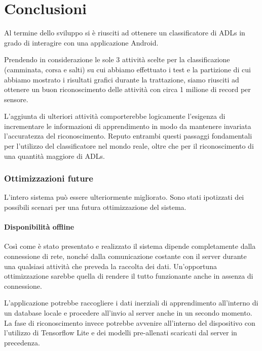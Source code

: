 \chapter{Conclusioni}
Al termine dello sviluppo si è riusciti ad ottenere un classificatore di ADLs in grado di interagire con una applicazione Android.

\vspace{5mm} %

Prendendo in considerazione le sole 3 attività scelte per la classificazione (camminata, corsa e salti) su cui abbiamo effettuato i test 
e la partizione di cui abbiamo mostrato i risultati grafici durante la trattazione, siamo riusciti ad ottenere un buon riconoscimento 
delle attività con circa 1 milione di record per sensore.

\vspace{5mm} %

L'aggiunta di ulteriori attività comporterebbe logicamente l'esigenza di incrementare le informazioni di apprendimento in modo da mantenere 
invariata l'accuratezza del riconoscimento. Reputo entrambi questi passaggi fondamentali per l'utilizzo del 
classificatore nel mondo reale, oltre che per il riconoscimento di una quantità maggiore di ADLs.

\subsection*{Ottimizzazioni future}
L'intero sistema può essere ulteriormente migliorato. 
Sono stati ipotizzati dei possibili scenari per una futura ottimizzazione del sistema.

\subsubsection{Disponibilità offline}
Così come è stato presentato e realizzato il sistema dipende completamente dalla connessione di rete, nonché dalla comunicazione costante con il server 
durante una qualsiasi attività che preveda la raccolta dei dati.
Un'opportuna ottimizzazione sarebbe quella di rendere il tutto funzionante anche in assenza di connessione.

\vspace{5mm} %
L'applicazione potrebbe raccogliere i dati inerziali di apprendimento all'interno di un database locale e procedere all'invio al server 
anche in un secondo momento. La fase di riconoscimento invece potrebbe avvenire all'interno del dispositivo con 
l'utilizzo di Tensorflow Lite \cite{tensorflow_lite} e dei modelli pre-allenati scaricati dal server in precedenza.

